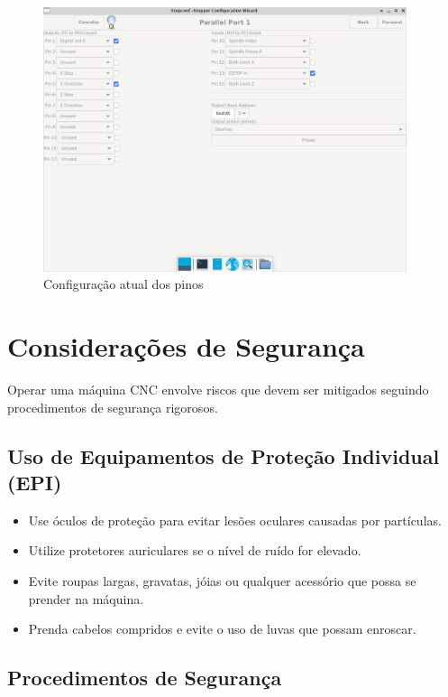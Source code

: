 \documentclass[twoside,a4paper]{refart}
\begin{document}
\begin{figure}[H]
    \begin{center}
        \includegraphics[width=0.95\textwidth]{imagens/stepconf_config.png}
    \end{center}
    \caption{Configuração atual dos pinos}\label{stepconfig}
\end{figure}

\section{Considerações de Segurança}

Operar uma máquina CNC envolve riscos que devem ser mitigados seguindo procedimentos de segurança rigorosos.

\subsection{Uso de Equipamentos de Proteção Individual (EPI)}

\begin{itemize} \item Use óculos de proteção para evitar lesões oculares causadas por partículas. \item Utilize protetores auriculares se o nível de ruído for elevado. \item Evite roupas largas, gravatas, jóias ou qualquer acessório que possa se prender na máquina. \item Prenda cabelos compridos e evite o uso de luvas que possam enroscar. \end{itemize}

\subsection{Procedimentos de Segurança}
\end{document}
